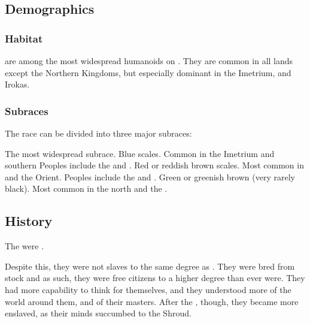 \subsection{Demographics}
\subsubsection{Habitat}
\Scathae{} are among the most widespread humanoids on \Miith{}. 
They are common in all lands except the Northern Kingdoms, but especially dominant in the Imetrium, \Durcac and Irokas. 





\subsubsection{Subraces}
The \scathaese{} race can be divided into three major subraces: 

\begin{gloss}
  \gitem[\Tassians]{\Tassian}
    The most widespread subrace. 
    Blue scales. 
    Common in the Imetrium and southern \Velcad{}
    Peoples include the  and . 
  \gitem[\Mekriis]{\Mekrii}
    Red or reddish brown scales.
    Most common in \Durcac and the Orient. 
    Peoples include the  and . 
  \gitem[\Lois]{\Loi}
    Green or greenish brown (very rarely black).
    Most common in the north and the \Serplands. 
\end{gloss}










\subsection{History}
The \scathae{} were . 

Despite this, they were not slaves to the same degree as \humans. 
They were bred from \naga{} stock and as such, they were free citizens to a higher degree than \humans{} ever were. 
They had more capability to think for themselves, and they understood more of the world around them, and of their masters. 
After the , though, they became more enslaved, as their minds succumbed to the Shroud.

